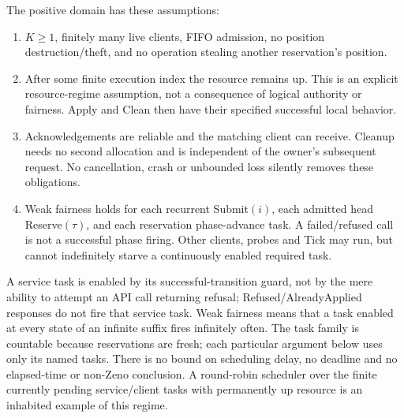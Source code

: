 \documentclass[11pt]{article}
\begin{document}
The positive domain has these assumptions:
\begin{enumerate}
\item $K\geq1$, finitely many live clients, FIFO admission, no position destruction/theft, and no operation stealing another reservation's position.
\item After some finite execution index the resource remains up. This is an explicit resource-regime assumption, not a consequence of logical authority or fairness. Apply and Clean then have their specified successful local behavior.
\item Acknowledgements are reliable and the matching client can receive. Cleanup needs no second allocation and is independent of the owner's subsequent request. No cancellation, crash or unbounded loss silently removes these obligations.
\item Weak fairness holds for each recurrent Submit$(i)$, each admitted head Reserve$(\tau)$, and each reservation phase-advance task. A failed/refused call is not a successful phase firing. Other clients, probes and Tick may run, but cannot indefinitely starve a continuously enabled required task.
\end{enumerate}
A service task is enabled by its successful-transition guard, not by the mere ability to attempt an API call returning refusal; Refused/AlreadyApplied responses do not fire that service task. Weak fairness means that a task enabled at every state of an infinite suffix fires infinitely often. The task family is countable because reservations are fresh; each particular argument below uses only its named tasks. There is no bound on scheduling delay, no deadline and no elapsed-time or non-Zeno conclusion. A round-robin scheduler over the finite currently pending service/client tasks with permanently up resource is an inhabited example of this regime.
\end{document}

